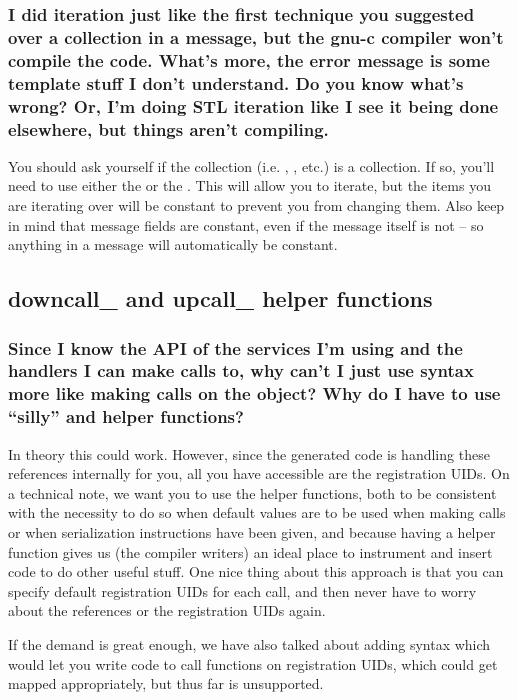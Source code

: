 \subsubsection*{I did iteration just like the first technique you suggested over a collection in a message, but the
gnu-c compiler won't compile the code.  What's more, the error message is some
template stuff I don't understand.  Do you know what's wrong?  Or, I'm doing
STL iteration like I see it being done elsewhere, but things aren't compiling.}

You should ask yourself if the collection (i.e. , 
, etc.) is a  collection.  If so, you'll 
need to use either the 
or the .  This will allow you 
to iterate, but the items you are iterating over will be constant to prevent
you from changing them.  Also keep in mind that message fields are constant, 
even if the message itself is not -- so anything in a message will
automatically be constant.

\subsection{downcall\_ and upcall\_ helper functions}
\label{faq:helperfns}

\subsubsection*{Since I know the API of the services I'm using and the handlers I can make
calls to, why can't I just use syntax more like making calls on the object?
Why do I have to use ``silly''  and  helper
functions?}

In theory this could work.  However, since the generated code is handling these
references internally for you, all you have accessible are the registration UIDs.
On a technical note, we want you to use the helper functions, both to be consistent
with the necessity to do so when default values are to be used when making calls or
when serialization instructions have been given, and because having a helper function
gives us (the compiler writers) an ideal place to instrument and insert code to do 
other useful stuff.  One nice thing about this approach is that you can specify default
registration UIDs for each call, and then never have to worry about the references
or the registration UIDs again.  

If the demand is great enough, we have also talked about adding syntax which would let you 
write code to call functions on registration UIDs, which could get mapped appropriately, 
but thus far is unsupported.

